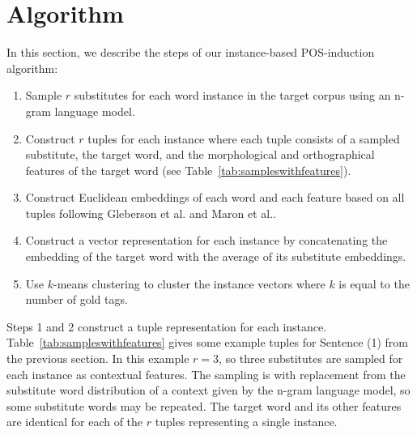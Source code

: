 \section{Algorithm}
\label{sec:algorithm}

In this section, we describe the steps of our instance-based
POS-induction algorithm:
\begin{enumerate}
  \item Sample $r$ substitutes for each word instance in the target
    corpus using an n-gram language model.
  \item Construct $r$ tuples for each instance where each tuple
    consists of a sampled substitute, the target word, and the
    morphological and orthographical features of the target word (see
    Table~\ref{tab:sampleswithfeatures}).
  \item Construct Euclidean embeddings of each word and each feature based on
    all tuples following Gleberson et al.
    and Maron et al..
  \item Construct a vector representation for each instance by
    concatenating the embedding of the target word with the average of
    its substitute embeddings.
  \item Use $k$-means clustering to cluster the instance vectors where
    $k$ is equal to the number of gold tags.
\end{enumerate}

Steps 1 and 2 construct a tuple representation for each instance.
Table~\ref{tab:sampleswithfeatures} gives some example tuples for Sentence (1)
from the previous section.  In this example $r=3$, so three substitutes are
sampled for each instance as contextual features.  The sampling is with
replacement from the substitute word distribution of a context given by the
n-gram language model, so some substitute words may be repeated.  The target
word and its other features are identical for each of the $r$ tuples
representing a single instance.

